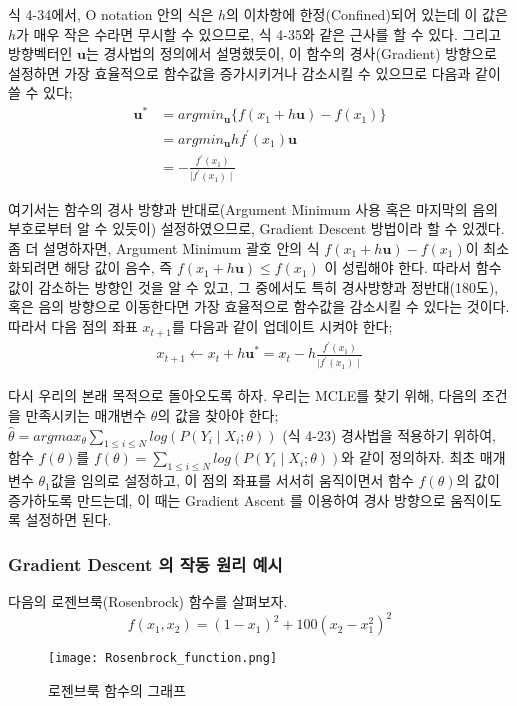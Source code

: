 \documentclass[a4paper]{oblivoir}
\begin{document}
\indent 식 4-34에서, O notation 안의 식은 $h$의 이차항에 한정(Confined)되어 있는데 이 값은 $h$가 매우 작은 수라면 무시할 수 있으므로, 식 4-35와 같은 근사를 할 수 있다. 그리고 방향벡터인 $\textbf{u}$는 경사법의 정의에서 설명했듯이, 이 함수의 경사(Gradient) 방향으로 설정하면 가장 효율적으로 함수값을 증가시키거나 감소시킬 수 있으므로 다음과 같이 쓸 수 있다;
\begin{align*}
\textbf{u}^{\ast} &= argmin_{\textbf{u}}\{f(x_{1}+h\textbf{u})-f(x_{1})\} \tag{4-36} \\
&= argmin_{\textbf{u}}hf^{\prime}(x_{1})\textbf{u} \tag{4-37} \\
&= -\frac{f^{\prime}(x_{1})}{\mid f^{\prime}(x_{1}) \mid} \tag{4-38}
\end{align*}

\indent 여기서는 함수의 경사 방향과 반대로(Argument Minimum 사용 혹은 마지막의 음의 부호로부터 알 수 있듯이) 설정하였으므로, Gradient Descent 방법이라 할 수 있겠다. 좀 더 설명하자면, Argument Minimum 괄호 안의 식 $f(x_{1}+h\textbf{u})-f(x_{1})$이 최소화되려면 해당 값이 음수, 즉 $f(x_{1}+h\textbf{u}) \leq f(x_{1})$ 이 성립해야 한다. 따라서 함수값이 감소하는 방향인 것을 알 수 있고, 그 중에서도 특히 경사방향과 정반대(180도), 혹은 음의 방향으로 이동한다면 가장 효율적으로 함수값을 감소시킬 수 있다는 것이다. \\
\indent 따라서 다음 점의 좌표 $x_{t+1}$를 다음과 같이 업데이트 시켜야 한다;
\begin{align*}
x_{t+1} \gets x_{t} + h\textbf{u}^{\ast} = x_{t} - h\frac{f^{\prime}(x_{1})}{\mid f^{\prime}(x_{1}) \mid} \tag{4-39}
\end{align*}

\indent 다시 우리의 본래 목적으로 돌아오도록 하자. 우리는 MCLE를 찾기 위해, 다음의 조건을 만족시키는 매개변수 $\theta$의 값을 찾아야 한다; \\
$\hat{\theta}=argmax_{\theta}\sum_{1\le i\le N}log(P(Y_{i} \mid X_{i};\theta))$ (식 4-23) 경사법을 적용하기 위하여, 함수 $f(\theta)$를 $f(\theta) = \sum_{1\leq i \leq N}log(P(Y_{i} \mid X_{i}; \theta))$와 같이 정의하자. 최초 매개변수 $\theta_{1}$값을 임의로 설정하고, 이 점의 좌표를 서서히 움직이면서 함수 $f(\theta)$의 값이 증가하도록 만드는데, 이 때는 Gradient Ascent 를 이용하여 경사 방향으로 움직이도록 설정하면 된다. 

\subsubsection{Gradient Descent 의 작동 원리 예시}
다음의 로젠브룩(Rosenbrock) 함수를 살펴보자. 
\begin{equation*} f(x_{1}, x_{2}) = (1 - x_{1})^{2} + 100(x_{2} - x_{1}^{2})^{2} \tag{4-40}\end{equation*}
\begin{figure}[ht]
\centering
\texttt{[image: Rosenbrock\_function.png]}
\caption{로젠브룩 함수의 그래프}
\label{Figure 4-8}
\end{figure}
\end{document}
